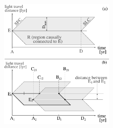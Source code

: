 \begin{figure}[!t]
   \centering
   \includegraphics[width=0.5\textwidth]{F_scheme.pdf}
    \label{F_scheme}
\end{figure}



       


